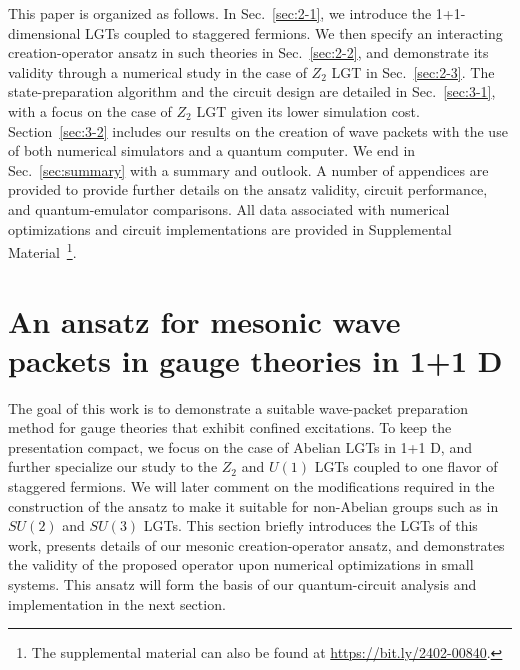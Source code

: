 \documentclass[a4paper,onecolumn,11pt,accepted=2024-10-11]{quantumarticle}
\begin{document}
This paper is organized as follows. In Sec.~\ref{sec:2-1}, we introduce the 1+1-dimensional LGTs coupled to staggered fermions. We then specify an interacting creation-operator ansatz in such theories in Sec.~\ref{sec:2-2}, and demonstrate its validity through a numerical study in the case of $Z_2$ LGT in Sec.~\ref{sec:2-3}. The state-preparation algorithm and the circuit design are detailed in Sec.~\ref{sec:3-1}, with a focus on the case of $Z_2$ LGT given its lower simulation cost. Section~\ref{sec:3-2} includes our results on the creation of wave packets with the use of both numerical simulators and a quantum computer. We end in Sec.~\ref{sec:summary} with a summary and outlook. A number of appendices are provided to provide further details on the ansatz validity, circuit performance, and quantum-emulator comparisons. All data associated with numerical optimizations and circuit implementations are provided in Supplemental Material~\footnote{The supplemental material can also be found at \url{https://bit.ly/2402-00840}.}.

\section{An ansatz for mesonic wave packets in gauge theories in 1+1 D
}
\label{sec:2}
\noindent
The goal of this work is to demonstrate a suitable wave-packet preparation method for gauge theories that exhibit confined excitations. To keep the presentation compact, we focus on the case of Abelian LGTs in 1+1 D, and further specialize our study to the $Z_2$ and $U(1)$ LGTs coupled to one flavor of staggered fermions. We will later comment on the modifications required in the construction of the ansatz to make it suitable for non-Abelian groups such as in $SU(2)$ and $SU(3)$ LGTs. This section briefly introduces the LGTs of this work, presents details of our mesonic creation-operator ansatz, and demonstrates the validity of the proposed operator upon numerical optimizations in small systems. This ansatz will form the basis of our quantum-circuit analysis and implementation in the next section.
\end{document}

